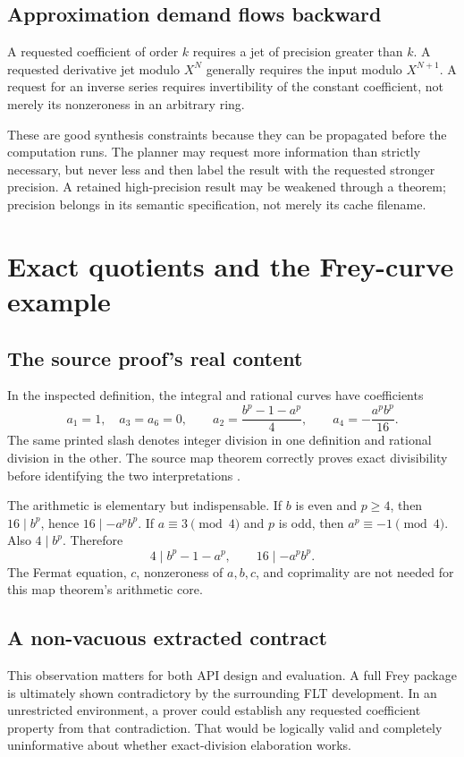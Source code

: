 \documentclass[11pt,letterpaper]{article}
\theoremstyle{definition}\newtheorem{definition}[theorem]{Definition}
\begin{document}
\subsection{Approximation demand flows backward}
A requested coefficient of order $k$ requires a jet of precision greater than $k$. A requested derivative jet modulo $X^N$ generally requires the input modulo $X^{N+1}$. A request for an inverse series requires invertibility of the constant coefficient, not merely its nonzeroness in an arbitrary ring.

These are good synthesis constraints because they can be propagated before the computation runs. The planner may request more information than strictly necessary, but never less and then label the result with the requested stronger precision. A retained high-precision result may be weakened through a theorem; precision belongs in its semantic specification, not merely its cache filename.

\section{Exact quotients and the Frey-curve example}\label{sec:frey}
\subsection{The source proof's real content}
In the inspected definition, the integral and rational curves have coefficients
\[
 a_1=1,\quad a_3=a_6=0,\qquad
 a_2=\frac{b^p-1-a^p}{4},\qquad
 a_4=-\frac{a^p b^p}{16}.
\]
The same printed slash denotes integer division in one definition and rational division in the other. The source map theorem correctly proves exact divisibility before identifying the two interpretations \cite{freyDef,freyMap}.

The arithmetic is elementary but indispensable. If $b$ is even and $p\ge4$, then $16\mid b^p$, hence $16\mid-a^pb^p$. If $a\equiv3\pmod4$ and $p$ is odd, then $a^p\equiv-1\pmod4$. Also $4\mid b^p$. Therefore
\[
 4\mid b^p-1-a^p,\qquad 16\mid-a^pb^p. \tag{F}
\]
The Fermat equation, $c$, nonzeroness of $a,b,c$, and coprimality are not needed for this map theorem's arithmetic core.

\subsection{A non-vacuous extracted contract}
This observation matters for both API design and evaluation. A full Frey package is ultimately shown contradictory by the surrounding FLT development. In an unrestricted environment, a prover could establish any requested coefficient property from that contradiction. That would be logically valid and completely uninformative about whether exact-division elaboration works.
\end{document}
